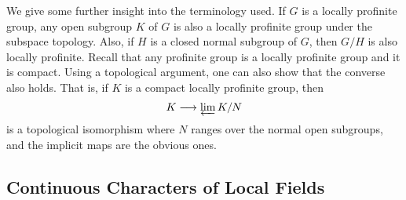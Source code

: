 We give some further insight into the terminology used. If $G$ is a locally profinite group, any open subgroup $K$ of $G$ is also a locally profinite group under the subspace topology. Also, if $H$ is a closed normal subgroup of $G$, then $G/H$ is also locally profinite. Recall that any profinite group is a locally profinite group and it is compact. Using a topological argument, one can also show that the converse also holds. That is, if $K$ is a compact locally profinite group, then
$$K\longrightarrow\varprojlim K/N$$
is a topological isomorphism where $N$ ranges over the normal open subgroups, and the implicit maps are the obvious ones.

\subsection{Continuous Characters of Local Fields}
